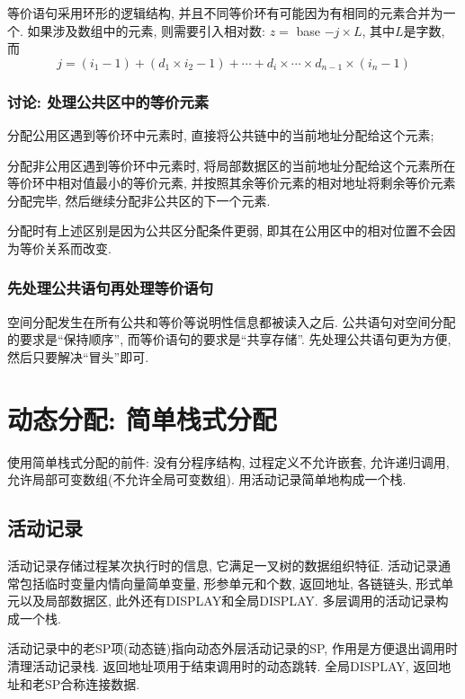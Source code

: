                 等价语句采用环形的逻辑结构, 并且不同等价环有可能因为有相同的元素合并为一个. 如果涉及数组中的元素, 则需要引入\textsf{相对数}: $z=$ base $-j\times L$, 其中$L$是字数, 而
                \[j=(i_1-1)+(d_1\times i_2-1)+\cdots+d_i\times\cdots\times d_{n-1}\times(i_n-1)\]

            \subsubsection{讨论: 处理公共区中的等价元素}

                分配公用区遇到等价环中元素时, 直接将公共链中的当前地址分配给这个元素;

                分配非公用区遇到等价环中元素时, 将局部数据区的当前地址分配给这个元素所在等价环中相对值最小的等价元素, 并按照其余等价元素的相对地址将剩余等价元素分配完毕, 然后继续分配非公共区的下一个元素.

                分配时有上述区别是因为公共区分配条件更弱, 即其在公用区中的相对位置不会因为等价关系而改变.

            \subsubsection{先处理公共语句再处理等价语句}

                空间分配发生在所有公共和等价等说明性信息都被读入之后. 公共语句对空间分配的要求是``保持顺序'', 而等价语句的要求是``共享存储''. 先处理公共语句更为方便, 然后只要解决``冒头''即可.

    \section{动态分配: 简单栈式分配}

        使用简单栈式分配的前件: 没有分程序结构, 过程定义不允许嵌套, 允许递归调用, 允许局部可变数组(不允许全局可变数组). 用活动记录简单地构成一个栈.

        \subsection{活动记录}

            \textsf{活动记录}存储过程某次执行时的信息, 它满足一叉树的数据组织特征. 活动记录通常包括临时变量内情向量简单变量, 形参单元和个数, 返回地址, 各链链头, 形式单元以及局部数据区, 此外还有DISPLAY和全局DISPLAY. 多层调用的活动记录构成一个栈.

            活动记录中的老SP项(动态链)指向动态外层活动记录的SP, 作用是方便退出调用时清理活动记录栈. 返回地址项用于结束调用时的动态跳转. 全局DISPLAY, 返回地址和老SP合称\textsf{连接数据}.

